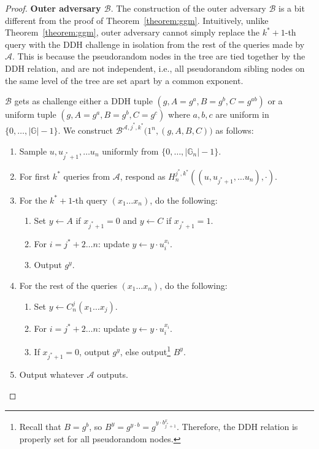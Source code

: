 \begin{proof}
    \noindent \textbf{Outer adversary $\mathcal{B}$}. The construction of the outer adversary $\mathcal{B}$ is a bit different from the proof of Theorem~\ref{theorem:ggm}. Intuitively, unlike Theorem~\ref{theorem:ggm}, outer adversary cannot simply replace the $k^*+1$-th query with the DDH challenge in isolation from the rest of the queries made by $\mathcal{A}$. This is because the pseudorandom nodes in the tree are tied together by the DDH relation, and are not independent, i.e., all pseudorandom sibling nodes on the same level of the tree are set apart by a common exponent.

    $\mathcal{B}$ gets as challenge either a DDH tuple $(g, A=g^a, B=g^b, C=g^{ab})$ or a uniform tuple $(g, A=g^a, B=g^b, C=g^c)$ where $a, b, c$ are uniform in $\{0, \dots, |\mathbb{G}|-1\}$. We construct $\mathcal{B}^{\mathcal{A}, j^*, k^*}\big(1^n, (g, A, B, C)\big)$ as follows:
    \begin{enumerate}
        \item Sample $u, u_{j^*+1}, \ldots u_n$ uniformly from $\{0, \dots, |\mathbb{G}_n|-1\}$.
        \item For first $k^*$ queries from $\mathcal{A}$, respond as $H_n^{j^*, k^*}((u, u_{j^*+1}, \ldots u_n),\cdot)$.
        \item For the $k^*+1$-th query $(x_1\ldots x_n)$, do the following:
              \begin{enumerate}
                  \item Set $y \gets A$ if $x_{j^*+1} = 0$ and $y \gets C$ if $x_{j^*+1} = 1$.
                  \item For $i = j^*+2 \dots n$: update $y \gets y \cdot u_i^{x_i}$.
                  \item Output $g^y$.
              \end{enumerate}
        \item For the rest of the queries $(x_1\ldots x_n)$, do the following:
              \begin{enumerate}
                  \item Set $y \gets C^j_n(x_1\ldots x_j)$.
                  \item For $i = j^*+2 \dots n$: update $y \gets y \cdot u_i^{x_i}$.
                  \item If $x_{j^*+1} = 0$, output $g^y$, else output\footnote{Recall that $B=g^b$, so $B^y = g^{y\cdot b} = g^{y\cdot b^x_{j^*+1}}$. Therefore, the DDH relation is properly set for all pseudorandom nodes.} $B^y$.
              \end{enumerate}
        \item Output whatever $\mathcal{A}$ outputs.
    \end{enumerate}


\end{proof}
